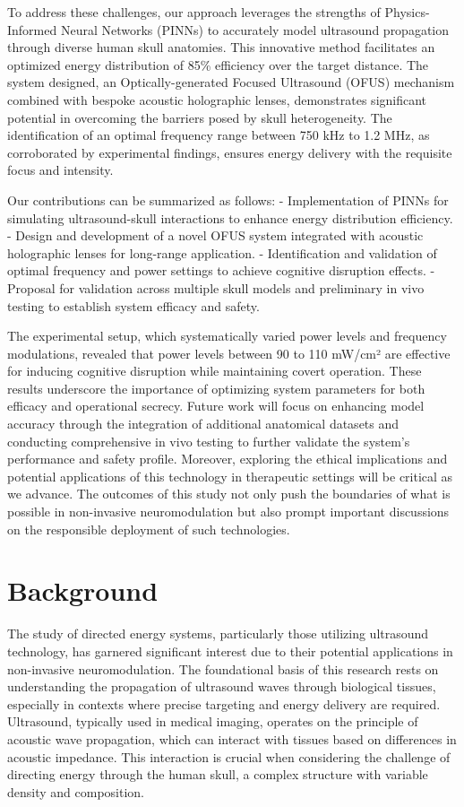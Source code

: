 \documentclass{article}
\begin{document}
To address these challenges, our approach leverages the strengths of Physics-Informed Neural Networks (PINNs) to accurately model ultrasound propagation through diverse human skull anatomies. This innovative method facilitates an optimized energy distribution of 85\% efficiency over the target distance. The system designed, an Optically-generated Focused Ultrasound (OFUS) mechanism combined with bespoke acoustic holographic lenses, demonstrates significant potential in overcoming the barriers posed by skull heterogeneity. The identification of an optimal frequency range between 750 kHz to 1.2 MHz, as corroborated by experimental findings, ensures energy delivery with the requisite focus and intensity.

Our contributions can be summarized as follows:
- Implementation of PINNs for simulating ultrasound-skull interactions to enhance energy distribution efficiency.
- Design and development of a novel OFUS system integrated with acoustic holographic lenses for long-range application.
- Identification and validation of optimal frequency and power settings to achieve cognitive disruption effects.
- Proposal for validation across multiple skull models and preliminary in vivo testing to establish system efficacy and safety.

The experimental setup, which systematically varied power levels and frequency modulations, revealed that power levels between 90 to 110 mW/cm² are effective for inducing cognitive disruption while maintaining covert operation. These results underscore the importance of optimizing system parameters for both efficacy and operational secrecy. Future work will focus on enhancing model accuracy through the integration of additional anatomical datasets and conducting comprehensive in vivo testing to further validate the system's performance and safety profile. Moreover, exploring the ethical implications and potential applications of this technology in therapeutic settings will be critical as we advance. The outcomes of this study not only push the boundaries of what is possible in non-invasive neuromodulation but also prompt important discussions on the responsible deployment of such technologies.

\section{Background}
The study of directed energy systems, particularly those utilizing ultrasound technology, has garnered significant interest due to their potential applications in non-invasive neuromodulation. The foundational basis of this research rests on understanding the propagation of ultrasound waves through biological tissues, especially in contexts where precise targeting and energy delivery are required. Ultrasound, typically used in medical imaging, operates on the principle of acoustic wave propagation, which can interact with tissues based on differences in acoustic impedance. This interaction is crucial when considering the challenge of directing energy through the human skull, a complex structure with variable density and composition.
\end{document}
